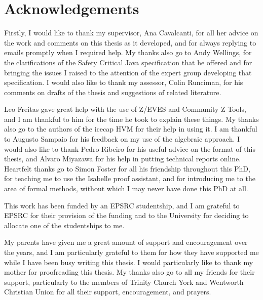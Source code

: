 \documentclass[a4paper,11pt,twoside,openright]{report}
\begin{document}
\cleardoublepage
{}
{}
\tableofcontents

\cleardoublepage
{}
{}
\listoftables

\cleardoublepage
{}
{}
\listoffigures

\cleardoublepage
{}
{}
\chapter*{Acknowledgements}

Firstly, I would like to thank my supervisor, Ana Cavalcanti, for all
her advice on the work and comments on this thesis as it developed,
and for always replying to emails promptly when I required help.
My thanks also go to Andy Wellings, for the clarifications of the
Safety Critical Java specification that he offered and for bringing
the issues I raised to the attention of the expert group developing
that specification.
I would also like to thank my assessor, Colin Runciman, for his
comments on drafts of the thesis and suggestions of related
literature.

Leo Freitas gave great help with the use of Z/EVES and Community Z
Tools, and I am thankful to him for the time he took to explain these
things.
My thanks also go to the authors of the icecap HVM for their help in
using it.
I am thankful to Augusto Sampaio for his feedback on my use of the
algebraic approach.
I would also like to thank Pedro Ribeiro for his useful advice on the
format of this thesis, and Alvaro Miyazawa for his help in putting
technical reports online.
Heartfelt thanks go to Simon Foster for all his friendship throughout
this PhD, for teaching me to use the Isabelle proof assistant, and for
introducing me to the area of formal methods, without which I may
never have done this PhD at all.

This work has been funded by an EPSRC studentship, and I am grateful to
EPSRC for their provision of the funding and to the University for
deciding to allocate one of the studentships to me.

My parents have given me a great amount of support and encouragement
over the years, and I am particularly grateful to them for how they
have supported me while I have been busy writing this thesis. 
I would particularly like to thank my mother for proofreading this
thesis.
My thanks also go to all my friends for their support, particularly to
the members of Trinity Church York and Wentworth Christian Union for
all their support, encouragement, and prayers.
\end{document}
